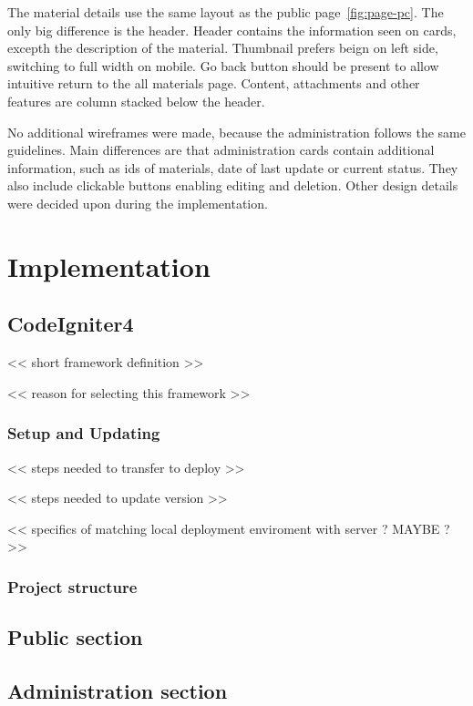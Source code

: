 \documentclass[
  digital,     %
  oneside,     %
  nosansbold,  %
  colorbold, %
  lof,         %
  lot,         %
]{fithesis4}
\begin{document}
The material details use the same layout as the public page~\ref{fig:page-pc}. The only big difference is the header. Header contains the information seen on cards, excepth the description of the material. Thumbnail prefers beign on left side, switching to full width on mobile. Go back button should be present to allow intuitive return to the all materials page. Content, attachments and other features are column stacked below the header.

No additional wireframes were made, because the administration follows the same guidelines. Main differences are that administration cards contain additional information, such as ids of materials, date of last update or current status.  They also include clickable buttons enabling editing and deletion. Other design details were decided upon during the implementation.

\chapter{Implementation}

\section{CodeIgniter4}

<< short framework definition >>

<< reason for selecting this framework >>

\subsection{Setup and Updating}

<< steps needed to transfer to deploy >>

<< steps needed to update version >>

<< specifics of matching local deployment enviroment with server ? MAYBE ?>>

\subsection{Project structure}

\section{Public section}

\section{Administration section}
\end{document}
